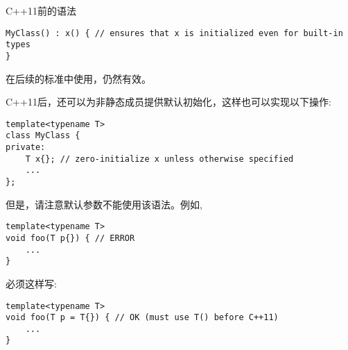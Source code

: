 C++11前的语法

\begin{lstlisting}[style=styleCXX]
MyClass() : x() { // ensures that x is initialized even for built-in types
}
\end{lstlisting}

在后续的标准中使用，仍然有效。

C++11后，还可以为非静态成员提供默认初始化，这样也可以实现以下操作:

\begin{lstlisting}[style=styleCXX]
template<typename T>
class MyClass {
private:
	T x{}; // zero-initialize x unless otherwise specified
	...
};
\end{lstlisting}

但是，请注意默认参数不能使用该语法。例如,

\begin{lstlisting}[style=styleCXX]
template<typename T>
void foo(T p{}) { // ERROR
	...
}
\end{lstlisting}

必须这样写:

\begin{lstlisting}[style=styleCXX]
template<typename T>
void foo(T p = T{}) { // OK (must use T() before C++11)
	...
}
\end{lstlisting}





















